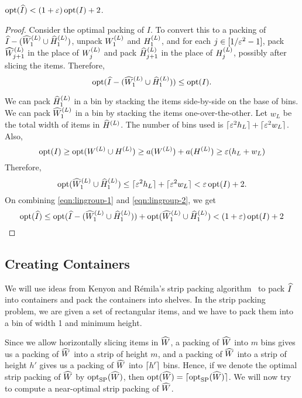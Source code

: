 \begin{lemma}
\label{thm:lingroup-opt-compare}
$\operatorname{opt}(\widehat{I}) < (1+\varepsilon)\operatorname{opt}(I) + 2$.
\end{lemma}
\begin{proof}
Consider the optimal packing of $I$.
To convert this to a packing of $\widehat{I} - (\widehat{W}^{(L)}_1 \cup \widehat{H}^{(L)}_1)$,
unpack $W^{(L)}_1$ and $H^{(L)}_1$, and for each $j \in [1/\varepsilon^2-1]$,
pack $\widehat{W}^{(L)}_{j+1}$ in the place of $W^{(L)}_j$
and pack $\widehat{H}^{(L)}_{j+1}$ in the place of $H^{(L)}_j$,
possibly after slicing the items.
Therefore,
\begin{equation}
\label{eqn:lingroup-1}
\operatorname{opt}(\widehat{I} - (\widehat{W}^{(L)}_1 \cup \widehat{H}^{(L)}_1)) \le \operatorname{opt}(I).
\end{equation}

We can pack $\widehat{H}^{(L)}_1$ in a bin by stacking the items side-by-side on the base of bins.
We can pack $\widehat{W}^{(L)}_1$ in a bin by stacking the items one-over-the-other.
Let $w_L$ be the total width of items in $\widehat{H}^{(L)}$. The number of bins used is
$\lceil \varepsilon^2h_L \rceil + \lceil \varepsilon^2w_L \rceil$. Also,
\[ \operatorname{opt}(I) \ge \operatorname{opt}(W^{(L)} \cup H^{(L)})
\ge a(W^{(L)}) + a(H^{(L)}) \ge \varepsilon(h_L + w_L) \]
Therefore,
\begin{equation}
\label{eqn:lingroup-2}
\operatorname{opt}(\widehat{W}^{(L)}_1 \cup \widehat{H}^{(L)}_1)
\le \lceil \varepsilon^2h_L \rceil + \lceil \varepsilon^2w_L \rceil < \varepsilon\operatorname{opt}(I) + 2.
\end{equation}
On combining \eqref{eqn:lingroup-1} and \eqref{eqn:lingroup-2}, we get
\[ \operatorname{opt}(\widehat{I}) \le \operatorname{opt}(\widehat{I} - (\widehat{W}^{(L)}_1 \cup \widehat{H}^{(L)}_1))
    + \operatorname{opt}(\widehat{W}^{(L)}_1 \cup \widehat{H}^{(L)}_1)
< (1+\varepsilon)\operatorname{opt}(I) + 2 \qedhere \]
\end{proof}

\subsection{Creating Containers}
\label{sec:bp-algo:create-containers}

We will use ideas from Kenyon and R\'emila's strip packing algorithm~\cite{kenyon1996strip}
to pack $\widehat{I}$ into containers and pack the containers into shelves.
In the strip packing problem, we are given a set of rectangular items,
and we have to pack them into a bin of width 1 and minimum height.

Since we allow horizontally slicing items in $\widehat{W}$,
a packing of $\widehat{W}$ into $m$ bins gives us a
packing of $\widehat{W}$ into a strip of height $m$,
and a packing of $\widehat{W}$ into a strip of height $h'$ gives us a
packing of $\widehat{W}$ into $\lceil h' \rceil$ bins.
Hence, if we denote the optimal strip packing of $\widehat{W}$ by $\operatorname{opt}_{\mathrm{SP}}(\widehat{W})$,
then $\operatorname{opt}(\widehat{W}) = \lceil \operatorname{opt}_{\mathrm{SP}}(\widehat{W}) \rceil$.
We will now try to compute a near-optimal strip packing of $\widehat{W}$.

